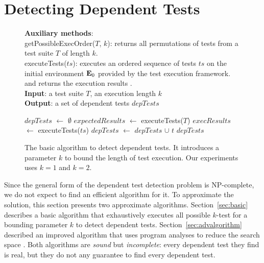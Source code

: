 \section{Detecting Dependent Tests}
\label{sec:detecting}

\newcommand{\testlist}[0]{\ensuremath{T^k_i}}
\newcommand{\executeTestsInOrder}[1]{\result{#1}{\env_0}}

\begin{figure}[t]
\textbf{Auxiliary methods}:\\
getPossibleExecOrder($T$, $k$): returns all permutations of tests from a test suite $T$ of length $k$.\\
executeTests($ts$): executes an ordered sequence of tests $ts$ 
on the initial environment $\mathbf{E}_0$ provided by the test execution framework.
and returns the execution results .\\
\textbf{Input}: a test suite $\mathit{T}$, an execution length $\mathit{k}$\\
\textbf{Output}: a set of dependent tests $\mathit{depTests}$\\
\vspace{-5mm}
\begin{algorithmic}[1]
\STATE $\mathit{depTests}$ $\leftarrow$ $\emptyset$
\STATE $\mathit{expectedResults}$ $\leftarrow$ executeTests($T$)
\STATE $\mathit{execResults}$ $\leftarrow$ executeTests($ts$)
\STATE $\mathit{depTests}$ $\leftarrow$ $\mathit{depTests}$ $\cup$ $\mathit{t}$
\ENDIF
\ENDFOR
\ENDFOR
\RETURN $\mathit{depTests}$
\end{algorithmic}
\vspace{-3mm}
\caption {The basic algorithm to detect dependent tests.
It introduces a parameter $k$ to bound the length of
test execution. Our experiments uses $k=1$ and $k=2$. } 
\label{fig:dtalgorithm}
\end{figure}

Since the general form of the dependent test detection problem is
NP-complete, we do not expect to find an efficient algorithm for it.
To approximate the solution, this section
presents two approximate algorithms.
Section~\ref{sec:basic} describes a basic algorithm that
exhaustively executes all possible $k$-test for a bounding parameter $k$
to detect dependent tests.
Section~\ref{sec:advalgorithm} described an improved algorithm
that uses program analyses to reduce the search space
.
Both algorithms are \textit{sound} but \textit{incomplete}:
every dependent test they find is real, but they do not
any guarantee to find every dependent test.


